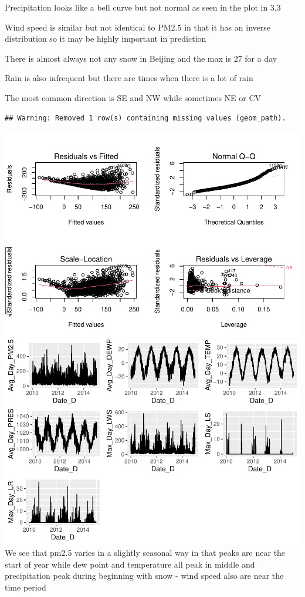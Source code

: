 \documentclass[
]{article}
\begin{document}
Precipitation looks like a bell curve but not normal as seen in the plot
in 3,3

Wind speed is similar but not identical to PM2.5 in that it has an
inverse distribution so it may be highly important in prediction

There is almost always not any snow in Beijing and the max is 27 for a
day

Rain is also infrequent but there are times when there is a lot of rain

The most common direction is SE and NW while sometimes NE or CV

\begin{verbatim}
## Warning: Removed 1 row(s) containing missing values (geom_path).
\end{verbatim}

\includegraphics{Final_Project_1_files/figure-latex/unnamed-chunk-5-1.pdf}
\includegraphics{Final_Project_1_files/figure-latex/unnamed-chunk-5-2.pdf}
We see that pm2.5 varies in a slightly seasonal way in that peaks are
near the start of year while dew point and temperature all peak in
middle and precipitation peak during beginning with snow - wind speed
also are near the time period
\end{document}
